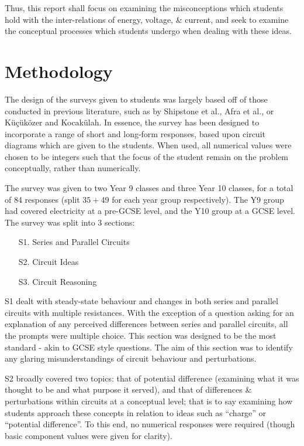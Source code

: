 \documentclass[a4paper,openany,nobib]{tufte-book}
\begin{document}
Thus, this report shall focus on examining the misconceptions which students hold with the inter-relations of energy, voltage, \& current, and seek to examine the conceptual processes which students undergo when dealing with these ideas.
\newpage
\chapter{Methodology}%
The design of the surveys given to students was largely based off of those conducted in previous literature, such as by Shipstone et al., Afra et al., or Küçüközer and Kocakülah\autocite{shipstone_europe,afra2009,kucu2007}. In essence, the survey has been designed to incorporate a range of short and long-form responses, based upon circuit diagrams which are given to the students. When used, all numerical values were chosen to be integers such that the focus of the student remain on the problem conceptually, rather than numerically.

The survey was given to two Year 9 classes and three Year 10 classes, for a total of 84 responses (split $35+49$ for each year group respectively). The Y9 group had covered electricity at a pre-GCSE level, and the Y10 group at a GCSE level. The survey was split into 3 sections:
\begin{itemize}
	\item[S1.] Series and Parallel Circuits
	\item[S2.] Circuit Ideas
	\item[S3.] Circuit Reasoning
\end{itemize}

S1 dealt with steady-state behaviour and changes in both series and parallel circuits with multiple resistances. With the exception of a question asking for an explanation of any perceived differences between series and parallel circuits, all the prompts were multiple choice. This section was designed to be the most standard - akin to GCSE style questions. The aim of this section was to identify any glaring misunderstandings of circuit behaviour and perturbations.

S2 broadly covered two topics:
that of potential difference (examining what it was thought to be and what purpose it served), and that of differences \& perturbations within circuits at a conceptual level; that is to say examining how students approach these concepts in relation to ideas such as ``charge'' or ``potential difference''. 
To this end, no numerical responses were required (though basic component values were given for clarity).
\end{document}
